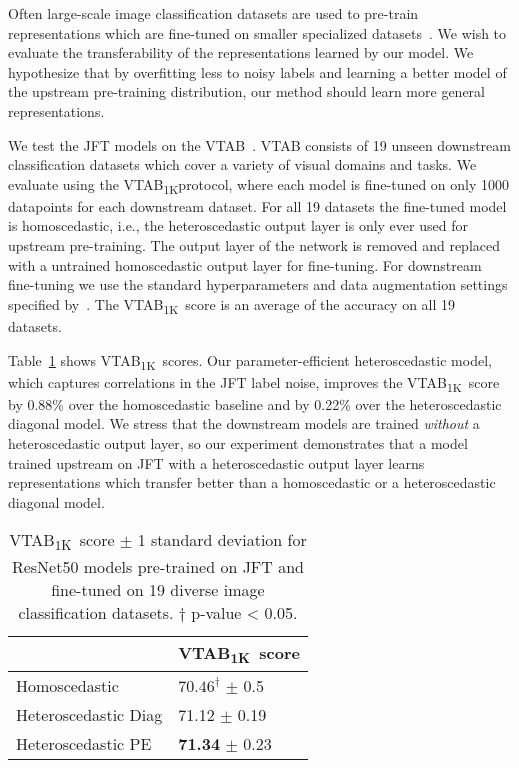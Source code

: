 \documentclass[final]{cvpr}
\newcommand{\vtab}{VTAB\textsubscript{1K}}
\begin{document}
Often large-scale image classification datasets are used to pre-train representations which are fine-tuned on smaller specialized datasets~\cite{zhai2020largescale,kolesnikov2019big,sun2017revisiting,djolonga2020robustness,raghu2019transfusion}. We wish to evaluate the transferability of the representations learned by our model. We hypothesize that by overfitting less to noisy labels and learning a better model of the upstream pre-training distribution, our method should learn more general representations.

We test the JFT models on the VTAB~\cite{zhai2020largescale}. VTAB consists of 19 unseen downstream classification datasets which cover a variety of visual domains and tasks. We evaluate using the \vtab protocol, where each model is fine-tuned on only 1000 datapoints for each downstream dataset. For all 19 datasets the fine-tuned model is homoscedastic, i.e., the heteroscedastic output layer is only ever used for upstream pre-training. The output layer of the network is removed and replaced with a untrained homoscedastic output layer for fine-tuning. For downstream fine-tuning we use the standard hyperparameters and data augmentation settings specified by~\citet{kolesnikov2019big}. The \vtab~score is an average of the accuracy on all 19 datasets.

Table~\ref{tab:vtab} shows \vtab~scores. Our parameter-efficient heteroscedastic model, which captures correlations in the JFT label noise, improves the \vtab~score by 0.88\% over the homoscedastic baseline and by 0.22\% over the heteroscedastic diagonal model. We stress that the downstream models are trained \textit{without} a heteroscedastic output layer, so our experiment demonstrates that a model trained upstream on JFT with a heteroscedastic output layer learns representations which transfer better than a homoscedastic or a heteroscedastic diagonal model.

\begin{table}[]
\centering
\begin{tabular}{@{}ll@{}}
\toprule
 & \vtab~score \\ \midrule
Homoscedastic & $70.46^\dagger$ $\pm$ 0.5 \\
Heteroscedastic Diag & 71.12 $\pm$ 0.19 \\
Heteroscedastic PE & \textbf{71.34} $\pm$ 0.23 \\ \bottomrule
\end{tabular}
\caption{\vtab~score $\pm$ 1 standard deviation for ResNet50 models pre-trained on JFT and fine-tuned on 19 diverse image classification datasets. $\dagger$ p-value < 0.05.}
\label{tab:vtab}
\end{table}
\end{document}
